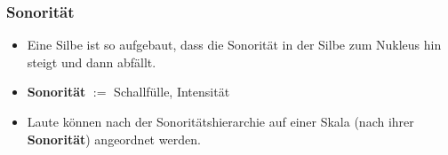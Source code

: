 \begin{frame}
\frametitle{Sonorität}

\begin{itemize}
	\item Eine Silbe ist so aufgebaut, dass die Sonorität in der Silbe zum Nukleus hin steigt und dann abfällt.

	\item \textbf{Sonorität} $:=$ Schallfülle, Intensität

\end{itemize}

\begin{figure}
	\centering
	\caption{\citet[93]{Ramers08a} \citep[nach][]{Lenerz85a}}
\end{figure}

\begin{itemize}
	\item Laute können nach der Sonoritätshierarchie auf einer Skala (nach ihrer \textbf{Sonorität}) angeordnet werden.
\end{itemize}

\end{frame}


